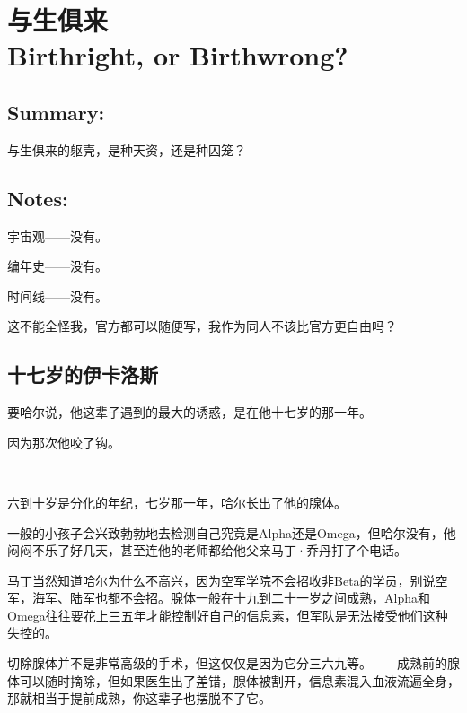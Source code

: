 \documentclass[../main]{subfiles}
\begin{document}
\pagestyle{mystyle}

\vspace{200em}

\chapter[与生俱来]{与生俱来 \\ Birthright, or Birthwrong?}
\vspace{3cm}


\section*{Summary:}

与生俱来的躯壳，是种天资，还是种囚笼？

\section*{Notes:}

宇宙观——没有。

编年史——没有。

时间线——没有。

这不能全怪我，官方都可以随便写，我作为同人不该比官方更自由吗？

\newpage

\section{十七岁的伊卡洛斯}

要哈尔说，他这辈子遇到的最大的诱惑，是在他十七岁的那一年。

因为那次他咬了钩。

~\

六到十岁是分化的年纪，七岁那一年，哈尔长出了他的腺体。

一般的小孩子会兴致勃勃地去检测自己究竟是Alpha还是Omega，但哈尔没有，他闷闷不乐了好几天，甚至连他的老师都给他父亲马丁·乔丹打了个电话。

马丁当然知道哈尔为什么不高兴，因为空军学院不会招收非Beta的学员，别说空军，海军、陆军也都不会招。腺体一般在十九到二十一岁之间成熟，Alpha和Omega往往要花上三五年才能控制好自己的信息素，但军队是无法接受他们这种失控的。

切除腺体并不是非常高级的手术，但这仅仅是因为它分三六九等。——成熟前的腺体可以随时摘除，但如果医生出了差错，腺体被割开，信息素混入血液流遍全身，那就相当于提前成熟，你这辈子也摆脱不了它。
\end{document}

